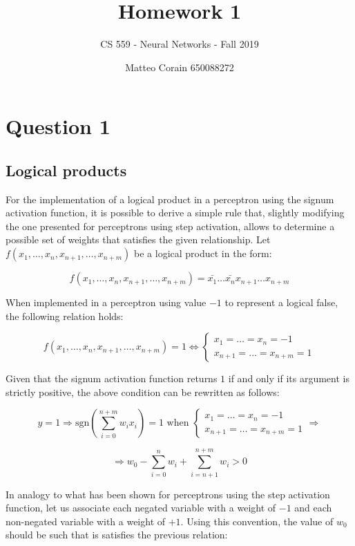 \documentclass[letterpaper,headings=standardclasses]{scrartcl}
\title{Homework 1}
\subtitle{CS 559 - Neural Networks - Fall 2019}
\author{Matteo Corain 650088272}
\begin{document}
\maketitle

\section{Question 1}

\subsection{Logical products}

For the implementation of a logical product in a perceptron using the signum activation function, it is possible to derive a simple rule that, slightly modifying the one presented for perceptrons using step activation, allows to determine a possible set of weights that satisfies the given relationship. Let $f(x_1, \dots, x_n, x_{n+1}, \dots, x_{n+m})$ be a logical product in the form:

$$ f(x_1, \dots, x_n, x_{n+1}, \dots, x_{n+m}) = \bar{x_1} \dots \bar{x_n} x_{n+1} \dots x_{n+m} $$

When implemented in a perceptron using value $-1$ to represent a logical false, the following relation holds:

$$ f(x_1, \dots, x_n, x_{n+1}, \dots, x_{n+m}) = 1 \Leftrightarrow \begin{cases} x_1 = \dots = x_n = -1 \\ x_{n+1} = \dots = x_{n+m} = 1\end{cases}$$

Given that the signum activation function returns $1$ if and only if its argument is strictly positive, the above condition can be rewritten as follows:

$$ y = 1 \Rightarrow \text{sgn} \left( \sum_{i=0}^{n+m} w_i x_i \right) = 1 \text{ when } \begin{cases} x_1 = \dots = x_n = -1 \\ x_{n+1} = \dots = x_{n+m} = 1\end{cases} \Rightarrow$$

$$ \Rightarrow w_0 - \sum_{i = 0}^{n} w_i + \sum_{i = n+1}^{n+m} w_i > 0 $$

In analogy to what has been shown for perceptrons using the step activation function, let us associate each negated variable with a weight of $-1$ and each non-negated variable with a weight of $+1$. Using this convention, the value of $w_0$ should be such that is satisfies the previous relation:
\end{document}
